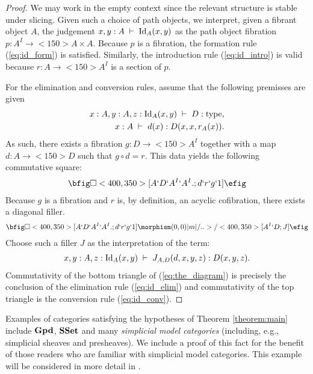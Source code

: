 \documentclass[12pt]{amsart}
\newcommand{\judge}[2]{#1\;\vdash\;#2}
\newcommand{\groupoids}{\textnormal{\textbf{Gpd}}}
\newcommand{\ssets}{\textnormal{\textbf{SSet}}}
\newcommand{\id}[1]{\textnormal{Id}_{#1}}
\newcommand{\type}{\operatorname{type}}
\theoremstyle{definition}
\theoremstyle{remark}
\begin{document}
\begin{proof}
  We may work in the empty context since the relevant structure is
  stable under slicing.  Given such a choice of path objects, we
  interpret, given a fibrant object $A$, the judgement
  $\judge{x,y:A}{\id{A}(x,y)}$ as the path object fibration
  $p:A^{I}\to<150>A\times A$.  Because $p$ is a fibration,
  the formation rule (\ref{eq:id_form}) is satisfied.  Similarly, the introduction rule
  (\ref{eq:id_intro}) is valid because $r:A\to<150>A^{I}$ is a section of $p$.

  For the elimination and conversion rules, assume
  that the following premisses are given 
  \begin{align*} 
    \judge{x:A,y:A,z:\id{A}(x,y)}{D:\type&},\\
    \judge{x:A}{d(x):D(x,x,r_{A}(x))&}. 
  \end{align*} 
  As such, there exists a fibration $g:D\to<150>A^{I}$ together with a
  map $d:A\to<150>D$ such that $g\circ d=r$.  This data yields the
  following commutative square: 
  \begin{align*} 
    \bfig 
    \square<400,350>[A`D`A^{I}`A^{I}.;d`r`g`1] 
    \efig 
  \end{align*} 
  Because $g$ is a fibration and $r$ is, by definition, an acyclic
  cofibration, there exists a diagonal filler.  
  \begin{align}\label{eq:the_diagram} 
    \bfig 
    \square<400,350>[A`D`A^{I}`A^{I}.;d`r`g`1] 
    \morphism(0,0)|m|/..>/<400,350>[A^{I}`D;J] 
    \efig 
  \end{align} 
  Choose such a filler $J$ as the interpretation of the term:
  \begin{align*}
    \judge{x,y:A,z:\id{A}(x,y)}{J_{A,D}(d,x,y,z):D(x,y,z)}.
  \end{align*}
  Commutativity of the bottom triangle of (\ref{eq:the_diagram}) is
  precisely the conclusion of the elimination rule (\ref{eq:id_elim}) and commutativity
  of the top triangle is the conversion rule (\ref{eq:id_conv}). 
\end{proof}
Examples of categories satisfying the hypotheses of Theorem
\ref{theorem:main} include $\groupoids$, $\ssets$ and many
\emph{simplicial model categories} \cite{Quillen:HA} (including, e.g.,
simplicial sheaves and presheaves).  We include a proof of this fact
for the benefit of those readers who are familiar with simplicial
model categories.  This example will be considered in more detail in
\cite{Warren:PhD}.
\end{document}
